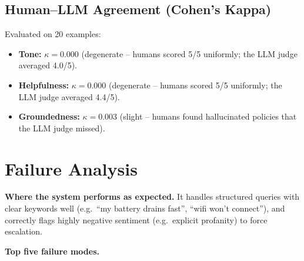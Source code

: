 \documentclass[11pt]{article}
\begin{document}
\subsection{Human--LLM Agreement (Cohen's Kappa)}
Evaluated on 20 examples:
\begin{itemize}
  \item \textbf{Tone:} $\kappa = 0.000$ (degenerate -- humans scored 5/5 uniformly; the LLM judge averaged 4.0/5).
  \item \textbf{Helpfulness:} $\kappa = 0.000$ (degenerate -- humans scored 5/5 uniformly; the LLM judge averaged 4.4/5).
  \item \textbf{Groundedness:} $\kappa = 0.003$ (slight -- humans found hallucinated policies that the LLM judge missed).
\end{itemize}

\section{Failure Analysis}

\textbf{Where the system performs as expected.} It handles structured queries with clear keywords well (e.g.\ ``my battery drains fast'', ``wifi won't connect''), and correctly flags highly negative sentiment (e.g.\ explicit profanity) to force escalation.

\textbf{Top five failure modes.}
\end{document}

